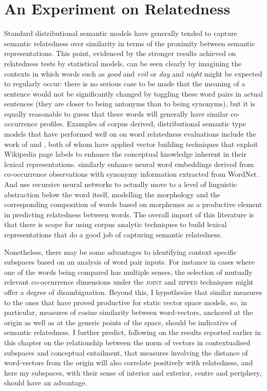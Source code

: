 \section{An Experiment on Relatedness}
Standard distributional semantic models have generally tended to capture semantic relatedness over similarity in terms of the proximity between semantic representations.  This point, evidenced by the stronger results achieved on relatedness tests by statistical models, can be seen clearly by imagining the contexts in which words such as \emph{good} and \emph{evil} or \emph{day} and \emph{night} might be expected to regularly occur: there is no serious case to be made that the meaning of a sentence would not be significantly changed by toggling these word pairs in actual sentences (they are closer to being antonyms than to being synonyms), but it is equally reasonable to guess that these words will generally have similar co-occurrence profiles.  Examples of corpus derived, distributional semantic type models that have performed well on on word relatedness evaluations include the work of \cite{GarbilovichEA2007} and \cite{HassanEA2011}, both of whom have applied vector building techniques that exploit Wikipedia page labels to enhance the conceptual knowledge inherent in their lexical representations.  \cite{HalawiEA2012} similarly enhance neural word embeddings derived from co-occurrence observations with synonymy information extracted from WordNet.  And \cite{LuongEA2013} use recursive neural networks to actually move to a level of linguistic abstraction below the word itself, modelling the morphology and the corresponding composition of words based on morphemes as a productive element in predicting relatedness between words.  The overall import of this literature is that there is scope for using corpus analytic techniques to build lexical representations that do a good job of capturing semantic relatedness.

Nonetheless, there may be some advantages to identifying context specific subspaces based on an analysis of word pair inputs.  For instance in cases where one of the words being compared has multiple senses, the selection of mutually relevant co-occurrence dimensions under the \textsc{joint} and \textsc{zipped} techniques might offer a degree of disambiguation.  Beyond this, I hypothesise that similar measures to the ones that have proved productive for static vector space models, so, in particular, measures of cosine similarity between word-vectors, anchored at the origin as well as at the generic points of the space, should be indicative of semantic relatedness.  I further predict, following on the results reported earlier in this chapter on the relationship between the norm of vectors in contextualised subspaces and conceptual entailment, that measures involving the distance of word-vectors from the origin will also correlate positively with relatedness, and here my subspaces, with their sense of interior and exterior, centre and periphery, should have an advantage.


